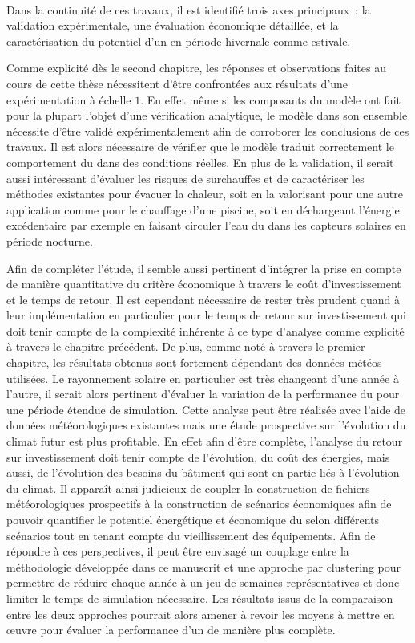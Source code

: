 \paragraph{} %
Dans la continuité de ces travaux, il est identifié trois axes principaux~: la validation
expérimentale, une évaluation économique détaillée, et la caractérisation du potentiel
d’un  en période hivernale comme estivale.

Comme explicité dès le second chapitre, les réponses et observations faites au cours de
cette thèse nécessitent d’être confrontées aux résultats d’une expérimentation à échelle
$1$. En effet même si les composants du modèle ont fait pour la plupart l’objet d’une
vérification analytique, le modèle dans son ensemble nécessite d’être validé
expérimentalement afin de corroborer les conclusions de ces travaux. Il est alors
nécessaire de vérifier que le modèle traduit correctement le comportement du
 dans des conditions réelles.
En plus de la validation, il serait aussi intéressant d’évaluer les risques de surchauffes
et de caractériser les méthodes existantes pour évacuer la chaleur, soit en la valorisant
pour une autre application comme pour le chauffage d’une piscine, soit en déchargeant
l’énergie excédentaire par exemple en faisant circuler l’eau du  dans les
capteurs solaires en période nocturne.

Afin de compléter l’étude, il semble aussi pertinent d’intégrer la prise en compte de manière
quantitative du critère économique à travers le coût d’investissement et le temps de
retour. Il est cependant nécessaire de rester très prudent quand à leur implémentation en
particulier pour le temps de retour sur investissement qui doit tenir compte de la
complexité inhérente à ce type d’analyse comme explicité à travers le chapitre précédent.
De plus, comme noté à travers le premier chapitre, les résultats obtenus sont fortement
dépendant des données météos utilisées. Le rayonnement solaire en particulier est très
changeant d’une année à l’autre, il serait alors pertinent d’évaluer la variation de la
performance du  pour une période étendue de simulation. Cette analyse peut être
réalisée avec l’aide de données météorologiques existantes mais une étude prospective sur
l’évolution du climat futur est plus profitable. En effet afin d’être complète, l’analyse
du retour sur investissement doit tenir compte de l’évolution, du coût des énergies, mais
aussi, de l’évolution des besoins du bâtiment qui sont en partie liés à l’évolution du climat. Il apparaît ainsi
judicieux de coupler la construction de fichiers météorologiques prospectifs à la
construction de scénarios économiques afin de pouvoir quantifier le potentiel énergétique
et économique du  selon différents scénarios tout en tenant compte du
vieillissement des équipements. Afin de répondre à ces perspectives, il peut être envisagé
un couplage entre la méthodologie développée dans ce manuscrit et une approche par clustering pour
permettre de réduire chaque année à un jeu de semaines représentatives et donc limiter le temps de
simulation nécessaire. Les résultats issus de la comparaison entre les deux
approches pourrait alors amener à revoir les moyens à mettre en œuvre pour évaluer la
performance d’un  de manière plus complète.


